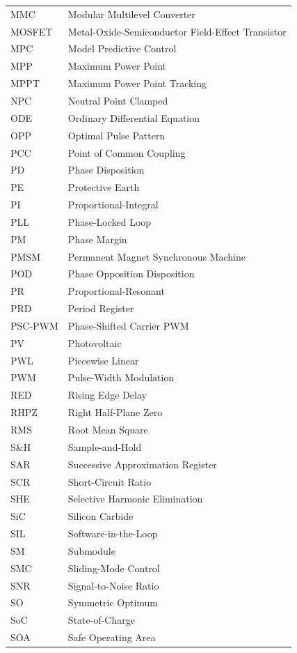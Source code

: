 \begin{longtable}{@{}p{3.5cm}p{10.5cm}@{}}
MMC & Modular Multilevel Converter \\
MOSFET & Metal-Oxide-Semiconductor Field-Effect Transistor \\
MPC & Model Predictive Control \\
MPP & Maximum Power Point \\
MPPT & Maximum Power Point Tracking \\
NPC & Neutral Point Clamped \\
ODE & Ordinary Differential Equation \\
OPP & Optimal Pulse Pattern \\
PCC & Point of Common Coupling \\
PD & Phase Disposition \\
PE & Protective Earth \\
PI & Proportional-Integral \\
PLL & Phase-Locked Loop \\
PM & Phase Margin \\
PMSM & Permanent Magnet Synchronous Machine \\
POD & Phase Opposition Disposition \\
PR & Proportional-Resonant \\
PRD & Period Register \\
PSC-PWM & Phase-Shifted Carrier PWM \\
PV & Photovoltaic \\
PWL & Piecewise Linear \\
PWM & Pulse-Width Modulation \\
RED & Rising Edge Delay \\
RHPZ & Right Half-Plane Zero \\
RMS & Root Mean Square \\
S\&H & Sample-and-Hold \\
SAR & Successive Approximation Register \\
SCR & Short-Circuit Ratio \\
SHE & Selective Harmonic Elimination \\
SiC & Silicon Carbide \\
SIL & Software-in-the-Loop \\
SM & Submodule \\
SMC & Sliding-Mode Control \\
SNR & Signal-to-Noise Ratio \\
SO & Symmetric Optimum \\
SoC & State-of-Charge \\
SOA & Safe Operating Area \\

\end{longtable}
